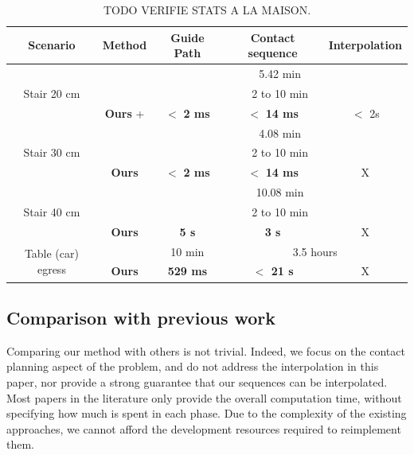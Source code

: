 \begin{table}
\centering
\begin{tabular}{ c | c | c | c | c }
 Scenario & Method  & Guide Path & Contact sequence & Interpolation \\
 \hline
   \multirow{3}{*}{Stair 20 cm} & \citeauthor{Hauser06usingmotion} &  \multicolumn{3}{c}{5.42 min}  \\
							 & \citeauthor{Mordatch:2012:DCB:2185520.2185539} &  \multicolumn{3}{c}{2 to 10 min} \\
							 & \textbf{Ours} + \citeauthor{Carpentier2016}  & $\mathbf{<}$ \textbf{2 ms} & $\mathbf{<}$ \textbf{14 ms} & $ <$ 2s \\
 \hline
   \multirow{3}{*}{Stair 30 cm} & \citeauthor{Hauser06usingmotion} &  \multicolumn{3}{c}{4.08 min}  \\
							 & \citeauthor{Mordatch:2012:DCB:2185520.2185539} &  \multicolumn{3}{c}{2 to 10 min} \\
							 & \textbf{Ours}  & $\mathbf{<}$ \textbf{2 ms} & $\mathbf{<}$ \textbf{14 ms} & X \\
 \hline
   \multirow{3}{*}{Stair 40 cm} & \citeauthor{Hauser06usingmotion} &  \multicolumn{3}{c}{10.08 min}  \\
							 & \citeauthor{Mordatch:2012:DCB:2185520.2185539} &  \multicolumn{3}{c}{2 to 10 min} \\
							 & \textbf{Ours}  & \textbf{5 s} & \textbf{3 s} & X \\
 \hline
   \multirow{2}{*}{Table (car) egress} & \citeauthor{Bouyarmane2009, DBLP:conf/iser/EscandeKMG08} & 10 min & \multicolumn{2}{c}{3.5 hours}  \\
							 & \textbf{Ours}  & \textbf{529 ms} & \textbf{$<$ 21 s} & X \\
 \end{tabular}
\caption{TODO VERIFIE STATS A LA MAISON.}
\label{tab:compprev}
\quad
\end{table}
\subsection{Comparison with previous work} \label{sec:compa}
Comparing our method with others is not trivial. Indeed, we focus on the contact planning aspect of the problem, and do not address
the interpolation in this paper, nor provide a strong guarantee that our sequences can be interpolated.
Most papers in the literature only provide the overall computation
time, without specifying how much is spent in each phase. Due to the complexity
of the existing approaches,  we cannot afford the development resources required to reimplement them.

